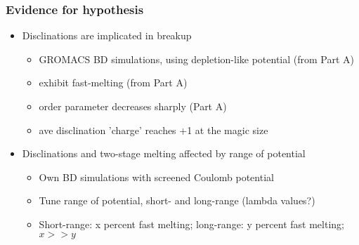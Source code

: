 \documentclass[11pt]{article}
\begin{document}
\subsubsection{Evidence for hypothesis}
\label{sec-3.1.4}

\begin{itemize}

\item Disclinations are implicated in breakup\\
\label{sec-3.1.4.1}

\begin{itemize}

\item GROMACS BD simulations, using depletion-like potential (from Part A)\\
\label{sec-3.1.4.1.1}


\item exhibit fast-melting (from Part A)\\
\label{sec-3.1.4.1.2}


\item order parameter decreases sharply (Part A)\\
\label{sec-3.1.4.1.3}


\item ave disclination 'charge' reaches +1 at the magic size\\
\label{sec-3.1.4.1.4}

\end{itemize} %

\item Disclinations and two-stage melting affected by range of potential\\
\label{sec-3.1.4.2}

\begin{itemize}

\item Own BD simulations with screened Coulomb potential\\
\label{sec-3.1.4.2.1}


\item Tune range of potential, short- and long-range (lambda values?)\\
\label{sec-3.1.4.2.2}


\item Short-range: x percent fast melting; long-range: y percent fast melting; $x>>y$\\
\label{sec-3.1.4.2.3}

\end{itemize} %
\end{itemize} %
\end{document}
